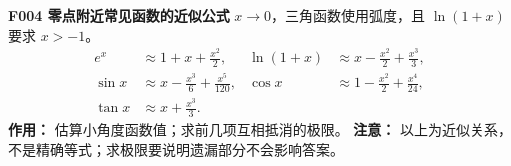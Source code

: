 \textbf{F004 零点附近常见函数的近似公式}\quad
$x\to0$，三角函数使用弧度，且 $\ln(1+x)$ 要求 $x>-1$。
\[
\begin{aligned}
 e^x&\approx1+x+\frac{x^2}{2},&
 \ln(1+x)&\approx x-\frac{x^2}{2}+\frac{x^3}{3},\\
 \sin x&\approx x-\frac{x^3}{6}+\frac{x^5}{120},&
 \cos x&\approx1-\frac{x^2}{2}+\frac{x^4}{24},\\
 \tan x&\approx x+\frac{x^3}{3}.
\end{aligned}
\]
\textbf{作用：} 估算小角度函数值；求前几项互相抵消的极限。
\textbf{注意：} 以上为近似关系，不是精确等式；求极限要说明遗漏部分不会影响答案。
